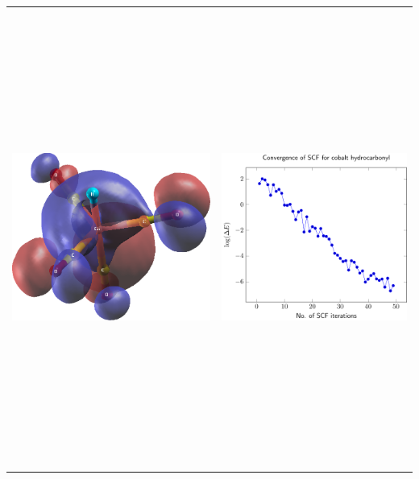 \documentclass[18pt]{standalone}
\begin{document}
{\centering
\begin{tabular}{cc}
\includegraphics[height=15cm]{HCobalt4CO_HOMO.png} &
\includegraphics[height=15cm]{plot_CONVERGENCE_SCF.pdf}
\end{tabular}
}
\end{document}
